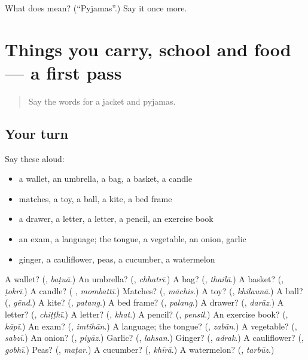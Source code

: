 \begin{tcolorbox}[breakable,colback=teal!4,colframe=teal!35!black,title={Before you move on}]
What does  mean? (\textquotedblleft{}Pyjamas\textquotedblright{}.) Say it once more.
\end{tcolorbox}
\section[(dialogue)]{Things you carry, school and food — a first pass}

\label{lesson:UR-R121-first-pass-things-you-carry-school-and-food}



\begin{quote}
Say the words for a jacket and pyjamas.
\end{quote}

\subsection*{Your turn}
Say these aloud:

\begin{itemize}
\raggedright
  \item a wallet, an umbrella, a bag, a basket, a candle
  \item matches, a toy, a ball, a kite, a bed frame
  \item a drawer, a letter, a letter, a pencil, an exercise book
  \item an exam, a language; the tongue, a vegetable, an onion, garlic
  \item ginger, a cauliflower, peas, a cucumber, a watermelon
\end{itemize}

\begin{tcolorbox}[breakable,colback=teal!4,colframe=teal!35!black,title={Before you move on}]
A wallet? (\textbf{}, \emph{baṭuā}.) An umbrella? (\textbf{}, \emph{chhatrī}.) A bag? (\textbf{}, \emph{thailā}.) A basket? (\textbf{}, \emph{ṭokrī}.) A candle? (\textbf{ }, \emph{mombattī}.) Matches? (\textbf{}, \emph{māchis}.) A toy? (\textbf{}, \emph{khilaunā}.) A ball? (\textbf{}, \emph{gēnd}.) A kite? (\textbf{}, \emph{patang}.) A bed frame? (\textbf{}, \emph{palang}.) A drawer? (\textbf{}, \emph{darāz}.) A letter? (\textbf{}, \emph{chiṭṭhī}.) A letter? (\textbf{}, \emph{khat}.) A pencil? (\textbf{}, \emph{pensil}.) An exercise book? (\textbf{}, \emph{kāpī}.) An exam? (\textbf{}, \emph{imtihān}.) A language; the tongue? (\textbf{}, \emph{zabān}.) A vegetable? (\textbf{}, \emph{sabzī}.) An onion? (\textbf{}, \emph{piyāz}.) Garlic? (\textbf{}, \emph{lahsan}.) Ginger? (\textbf{}, \emph{adrak}.) A cauliflower? (\textbf{}, \emph{gobhī}.) Peas? (\textbf{}, \emph{maṭar}.) A cucumber? (\textbf{}, \emph{khīrā}.) A watermelon? (\textbf{}, \emph{tarbūz}.)
\end{tcolorbox}
